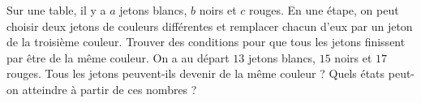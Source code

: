Sur une table, il y a $a$ jetons blancs, $b$ noirs et $c$ rouges. En une étape, on peut choisir deux jetons de couleurs différentes et remplacer chacun d'eux par un jeton de la troisième couleur. Trouver des conditions pour que tous les jetons finissent par être de la même couleur. On a au départ $13$ jetons blancs, $15$ noirs et $17$ rouges. Tous les jetons peuvent-ils devenir de la même couleur ? Quels états peut-on atteindre à partir de ces nombres ?

